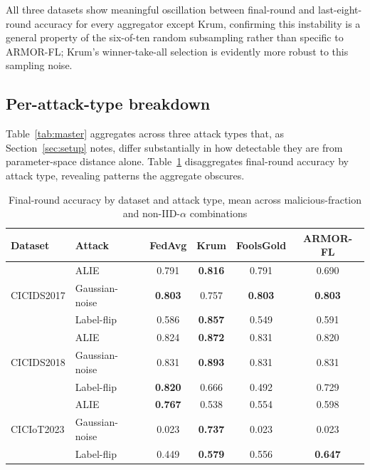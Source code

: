 \documentclass[pdflatex,iicol,sn-mathphys-num]{sn-jnl}%
\theoremstyle{thmstyleone}%
\theoremstyle{thmstyletwo}%
\theoremstyle{thmstylethree}%
\begin{document}
All three datasets show meaningful oscillation between final-round and last-eight-round accuracy for every aggregator except Krum, confirming this instability is a general property of the six-of-ten random subsampling rather than specific to ARMOR-FL; Krum's winner-take-all selection is evidently more robust to this sampling noise.

\subsection{Per-attack-type breakdown}\label{sec:perattack}

Table~\ref{tab:master} aggregates across three attack types that, as Section~\ref{sec:setup} notes, differ substantially in how detectable they are from parameter-space distance alone. Table~\ref{tab:perattack} disaggregates final-round accuracy by attack type, revealing patterns the aggregate obscures.

\begin{table}[htbp]
\centering
\caption{Final-round accuracy by dataset and attack type, mean across malicious-fraction and non-IID-$\alpha$ combinations}\label{tab:perattack}
\footnotesize
\begin{tabular}{@{}llcccc@{}}
\toprule
Dataset & Attack & FedAvg & Krum & FoolsGold & ARMOR-FL \\
\midrule
\multirow{3}{*}{CICIDS2017} & ALIE & 0.791 & \textbf{0.816} & 0.791 & 0.690 \\
 & Gaussian-noise & \textbf{0.803} & 0.757 & \textbf{0.803} & \textbf{0.803} \\
 & Label-flip & 0.586 & \textbf{0.857} & 0.549 & 0.591 \\
\midrule
\multirow{3}{*}{CICIDS2018} & ALIE & 0.824 & \textbf{0.872} & 0.831 & 0.820 \\
 & Gaussian-noise & 0.831 & \textbf{0.893} & 0.831 & 0.831 \\
 & Label-flip & \textbf{0.820} & 0.666 & 0.492 & 0.729 \\
\midrule
\multirow{3}{*}{CICIoT2023} & ALIE & \textbf{0.767} & 0.538 & 0.554 & 0.598 \\
 & Gaussian-noise & 0.023 & \textbf{0.737} & 0.023 & 0.023 \\
 & Label-flip & 0.449 & \textbf{0.579} & 0.556 & \textbf{0.647} \\
\bottomrule
\end{tabular}
\end{table}
\end{document}
